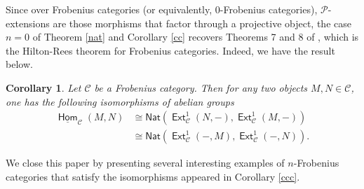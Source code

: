 \documentclass[11pt,a4paper]{amsart}
\newcommand{\C}{\mathscr{C} }
\newcommand{\p}{\mathfrak{p} }
\def\Ext{\operatorname{{\mathsf{Ext}}}}
\def\hom{\operatorname{{\mathsf{Hom}}}}
\def\hom{\operatorname{\mathsf{Hom}}}
\def\p{\mathcal P}
\newcommand{\nat}{{\mathsf{Nat}}}
\newtheorem{cor}[theorem]{Corollary}
\theoremstyle{definition}
\theoremstyle{plain}
\theoremstyle{definition}
\numberwithin{equation}{section}
\begin{document}
Since over Frobenius categories (or equivalently, 0-Frobenius categories), $\p$-extensions are those morphisms that factor through a projective object, the case $n=0$ of Theorem \ref{nat} and Corollary \ref{cc} recovers Theorems 7 and 8 of \cite{mart}, which is the Hilton-Rees theorem for Frobenius categories. Indeed, we have the result below.

\begin{cor}\label{c44}Let $\C$ be a Frobenius category. Then  for any two objects $M, N\in\C$, one has the following isomorphisms of abelian groups
\[\begin{array}{lllll}
\underline{\hom}_{\C}(M, N) & \cong \nat(\Ext^{1}_{\C}(N, -), \Ext^{1}_{\C}(M, -))\\
& \cong \nat(\Ext^{1}_{\C}(-, M), \Ext^{1}_{\C}(-, N)).
\end{array}\]
\end{cor}
We close this paper by presenting several interesting examples of $n$-Frobenius categories that satisfy the  isomorphisms appeared in Corollary \ref{ccc}.
\end{document}
